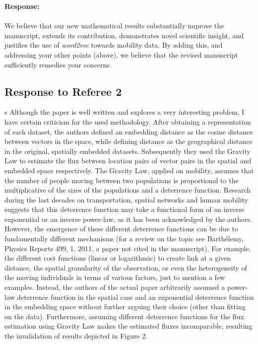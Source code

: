 \documentclass[12pt,a4paper]{article}
\newcounter{comment}[subsection]
\newcommand{\response}[1]{{\noindent \textbf{Response:} \\ \\ \noindent #1}}
\newcommand{\rcomment}[1]{%
\vspace{10pt}
\begin{sectionbox}
s #1
\end{sectionbox}
}
\begin{document}
\response{We believe that our new mathematical results substantially improve the manuscript, extends its contribution, demonstrates novel scientific insight, and justifies the use of \textit{word2vec} towards mobility data. By adding this, and addressing your other points (above), we believe that the revised manuscript sufficiently remedies your concerns.

}



%
%
\clearpage
\setcounter{section}{3}
\subsection{Response to Referee 2}
\setcounter{section}{2}


\rcomment{%
	Although the paper is well written and explores a very interesting problem, I have certain criticism for the used methodology. After obtaining a representation of each dataset, the authors defined an embedding distance as the cosine distance between vectors in the space, while defining distance as the geographical distance in the original, spatially embedded datasets. Subsequently they used the Gravity Law to estimate the flux between location pairs of vector pairs in the spatial and embedded space respectively. The Gravity Law, applied on mobility, assumes that the number of people moving between two populations is proportional to the multiplicative of the sizes of the populations and a deterrence function. Research during the last decades on transportation, spatial networks and human mobility suggests that this deterrence function may take a functional form of an inverse exponential or an inverse power-law, as it has been acknowledged by the authors. However, the emergence of these different deterrence functions can be due to fundamentally different mechanisms (for a review on the topic see Barthélemy, Physics Reports 499, 1, 2011, a paper not cited in the manuscript). For example, the different cost functions (linear or logarithmic) to create link at a given distance, the spatial granularity of the observation, or even the heterogeneity of the moving individuals in terms of various factors, just to mention a few examples. Instead, the authors of the actual paper arbitrarily assumed a power-law deterrence function in the spatial case and an exponential deterrence function in the embedding space without further arguing their choice (other than fitting on the data). Furthermore, assuming different deterrence functions for the flux estimation using Gravity Law makes the estimated fluxes incomparable, resulting the invalidation of results depicted in Figure 2.
}
\end{document}
